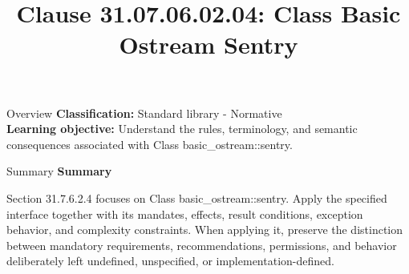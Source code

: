 \documentclass[10pt,letterpaper]{article}
\title{Clause 31.07.06.02.04: Class Basic Ostream Sentry}
\author{}
\date{}
\begin{document}
\maketitle
\begin{CornellOverviewBox}{Overview}
\textbf{Classification:} Standard library - Normative\\[2pt]
\textbf{Learning objective:} Understand the rules, terminology, and semantic consequences associated with Class basic\_ostream::sentry.
\end{CornellOverviewBox}\begin{CornellSummaryBox}{Summary}
{\sffamily\bfseries\color{Accent} Summary}\par\vspace{3pt}Section 31.7.6.2.4 focuses on Class basic\_ostream::sentry. Apply the specified interface together with its mandates, effects, result conditions, exception behavior, and complexity constraints. When applying it, preserve the distinction between mandatory requirements, recommendations, permissions, and behavior deliberately left undefined, unspecified, or implementation-defined.
\end{CornellSummaryBox}
\end{document}
